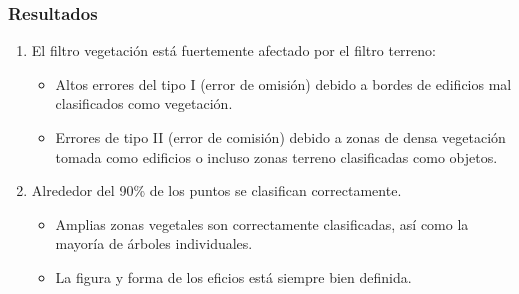 \begin{frame}
  \frametitle{Resultados}
  \begin{enumerate}[<+->]
    \item El filtro vegetación está fuertemente afectado por el filtro terreno:
    \begin{itemize}
      \item Altos errores del tipo I (error de omisión) debido
        a bordes de edificios mal clasificados como vegetación.
      \item Errores de tipo II (error de comisión) debido
        a zonas de densa vegetación tomada como edificios o incluso zonas
        terreno clasificadas como objetos.
    \end{itemize}
    \item Alrededor del 90\% de los puntos se clasifican correctamente.
    \begin{itemize}
      \item Amplias zonas vegetales son correctamente clasificadas, así como la
        mayoría de árboles individuales. 
      \item La figura y forma de los eficios está siempre bien definida.
    \end{itemize}
  \end{enumerate}
\end{frame}
